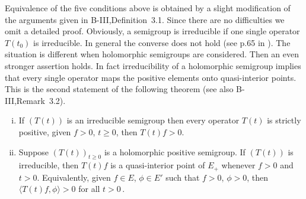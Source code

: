 Equivalence of the five conditions above is obtained by a slight modification of the arguments given in B-III,Definition~3.1.
Since there are no difficulties we omit a detailed proof.
Obviously, a semigroup is irreducible if one single operator $T(t_{0})$ is irreducible.
In general the converse does not hold (see p.65 in \citet{greiner:1982}).
The situation is different when holomorphic semigroups are considered.
Then an even stronger assertion holds. In fact irreducibility of a holomorphic semigroup implies that every single operator maps the positive elements onto quasi-interior points.
This is the second statement of the following theorem (see also B-III,Remark~3.2).
\begin{theorem}\label{thm:c3-3.2}
	\begin{enumerate}[(i), wide]
	\item
 	If $(T(t))$ is an irreducible semigroup then every operator $T(t)$ is strictly positive, \ie 
	given $f > 0$, $t \geq 0$, then $T(t)f > 0$.
	
	\item 
	Suppose $(T(t))_{t\geq 0}$ is a holomorphic positive semigroup.
	If $(T(t))$ is irreducible, then $T(t)f$ is a quasi-interior point of $E_{+}$ whenever $f > 0$ and $t > 0$.
	Equivalently, given $f \in E$, $\phi \in E'$ such that $f > 0$, $\phi > 0$, then $\langle T(t)f,\phi \rangle > 0$ for all $t > 0$\,.
	\end{enumerate}
\end{theorem}
%
%

